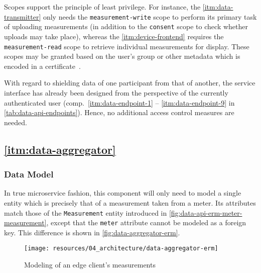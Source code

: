 \begin{description}
\FloatBarrier

	Scopes support the principle of least privilege. For instance, the \ref{itm:data-transmitter} only needs the \texttt{measurement-write} scope to perform its primary task of uploading measurements (in addition to the \texttt{consent} scope to check whether uploads may take place), whereas the \ref{itm:device-frontend} requires the \linebreak \texttt{measurement-read} scope to retrieve individual measurements for display. These scopes may be granted based on the user's group or other metadata which is encoded in a certificate~\cite[p.~1]{butt2004certificate}.
\FloatBarrier

\end{description}

With regard to shielding data of one participant from that of another, the service interface has already been designed from the perspective of the currently authenticated user (comp.~\ref{itm:data-endpoint-1} -- \ref{itm:data-endpoint-9} in \autoref{tab:data-api-endpoints}). Hence, no additional access control measures are needed.


\subsection{\ref*{itm:data-aggregator}}
\label{sec:component-specification-data-aggregator}

\subsubsection{Data Model}
\label{sec:data-aggregator-data-model}

In true microservice fashion, this component will only need to model a single entity which is precisely that of a measurement taken from a meter. Its attributes match those of the \texttt{Measurement} entity introduced in \autoref{fig:data-api-erm-meter-measurement}, except that the \texttt{meter} attribute cannot be modeled as a foreign key. This difference is shown in \autoref{fig:data-aggregator-erm}.

\begin{figure}[hbt]
  \centering
  \texttt{[image: resources/04\_architecture/data-aggregator-erm]}
  \caption{Modeling of an edge client's measurements}
  \label{fig:data-aggregator-erm}
\end{figure}

